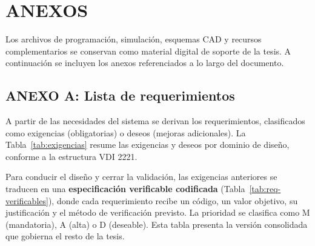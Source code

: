 \chapter*{ANEXOS}\label{anexos}

\noindent Los archivos de programación, simulación, esquemas CAD y recursos complementarios se conservan
como material digital de soporte de la tesis. A continuación se incluyen los anexos referenciados a lo largo
del documento.

\section*{ANEXO A: Lista de requerimientos}
\label{anexo:requerimientos}

A partir de las necesidades del sistema se derivan los requerimientos, clasificados como exigencias
(obligatorias) o deseos (mejoras adicionales). La Tabla~\ref{tab:exigencias} resume las exigencias y deseos
por dominio de diseño, conforme a la estructura VDI 2221.

Para conducir el diseño y cerrar la validación, las exigencias anteriores se traducen en una
\textbf{especificación verificable codificada} (Tabla~\ref{tab:req-verificables}), donde cada requerimiento
recibe un código, un valor objetivo, su justificación y el método de verificación previsto. La
prioridad se clasifica como M (mandatoria), A (alta) o D (deseable). Esta tabla presenta la versión
consolidada que gobierna el resto de la tesis.


